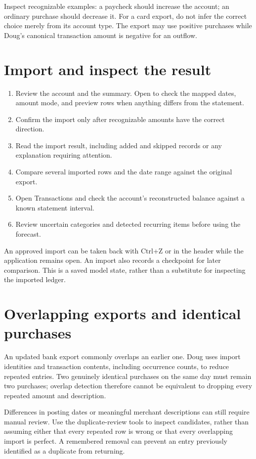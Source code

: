 Inspect recognizable examples: a paycheck should increase the account; an ordinary purchase should decrease it. For a card export, do not infer the correct choice merely from its account type. The export may use positive purchases while Doug's canonical transaction amount is negative for an outflow.

\section{Import and inspect the result}
\begin{enumerate}
\item Review the account and the  summary. Open  to check the mapped dates, amount mode, and preview rows when anything differs from the statement.
\item Confirm the import only after recognizable amounts have the correct direction.
\item Read the import result, including added and skipped records or any explanation requiring attention.
\item Compare several imported rows and the date range against the original export.
\item Open Transactions and check the account's reconstructed balance against a known statement interval.
\item Review uncertain categories and detected recurring items before using the forecast.
\end{enumerate}

An approved import can be taken back with Ctrl+Z or  in the header while the application remains open. An import also records a checkpoint for later comparison. This is a saved model state, rather than a substitute for inspecting the imported ledger.

\section{Overlapping exports and identical purchases}
An updated bank export commonly overlaps an earlier one. Doug uses import identities and transaction contents, including occurrence counts, to reduce repeated entries. Two genuinely identical purchases on the same day must remain two purchases; overlap detection therefore cannot be equivalent to dropping every repeated amount and description.

Differences in posting dates or meaningful merchant descriptions can still require manual review. Use the duplicate-review tools to inspect candidates, rather than assuming either that every repeated row is wrong or that every overlapping import is perfect. A remembered removal can prevent an entry previously identified as a duplicate from returning.

